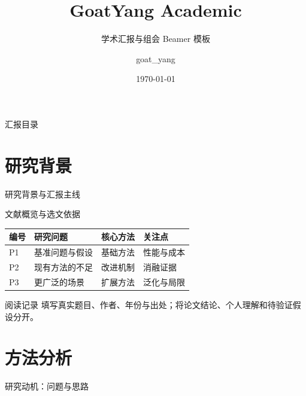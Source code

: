 \documentclass[aspectratio=169,11pt]{beamer}
\title{GoatYang Academic}
\subtitle{学术汇报与组会 Beamer 模板}
\author[goat\_yang]{goat\_yang}
\institute{学院 / 研究机构 · 课题组}
\date{\today}
\begin{document}
\begin{frame}\titlepage\end{frame}
\begin{frame}{汇报目录}\tableofcontents[hideallsubsections]\end{frame}

\section{研究背景}
\begin{frame}[t]{研究背景与汇报主线}
\contentdivider
{}
\end{frame}

\begin{frame}[t]{文献概览与选文依据}
\begin{tabularx}{\textwidth}{lYYY}
\toprule 编号 & 研究问题 & 核心方法 & 关注点 \\
\midrule
P1 & 基准问题与假设 & 基础方法 & 性能与成本 \\
P2 & 现有方法的不足 & 改进机制 & 消融证据 \\
P3 & 更广泛的场景 & 扩展方法 & 泛化与局限 \\
\bottomrule
\end{tabularx}
\vspace{.3cm}
\begin{block}{阅读记录}
填写真实题目、作者、年份与出处；将论文结论、个人理解和待验证假设分开。
\end{block}
\end{frame}

\section{方法分析}
\begin{frame}[t]{研究动机：问题与思路}
\begin{columns}[T,onlytextwidth]
\begin{column}{.48\textwidth}
\end{column}
\begin{column}{.48\textwidth}
\end{column}
\end{columns}
\end{frame}
\end{document}
